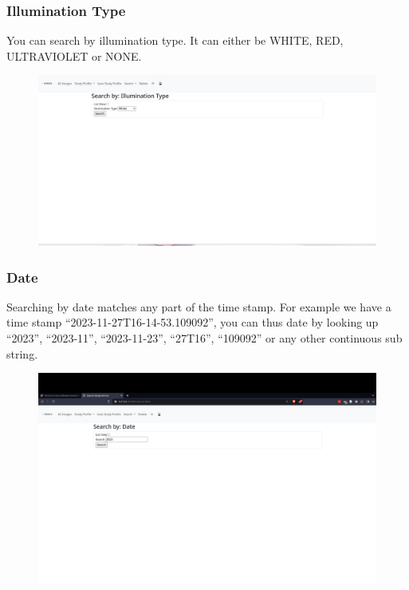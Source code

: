 \documentclass[12pt]{article}
\begin{document}
\begin{center}
	\subsubsection{Illumination Type}
	You can search by illumination type. It can either be WHITE, RED, ULTRAVIOLET or NONE.
	\begin{figure}[H]
		\includegraphics[width=\textwidth]{Figures/Search-By-Illumination-Type.png}
	\end{figure}
	\subsubsection{Date}
	Searching by date matches any part of the time stamp. For example we have a time stamp ``2023-11-27T16-14-53.109092'', you can thus date by looking up ``2023'', ``2023-11'', ``2023-11-23'', ``27T16'', ``109092'' or any other continuous sub string.
	\begin{figure}[H]
		\includegraphics[width=\textwidth]{Figures/Search-By-Date.png}
	\end{figure}

\end{center}
\end{document}
